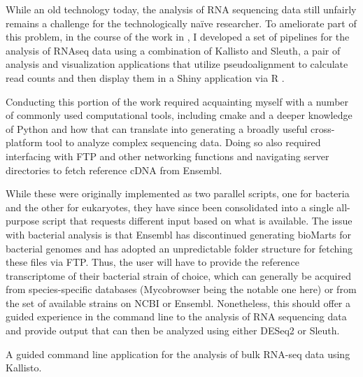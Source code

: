 While an old technology today, the analysis of RNA sequencing data still unfairly remains a challenge for the technologically na\"{i}ve researcher. To ameliorate part of this problem, in the course of the work in \citet{Saelens2022}, I developed a set of pipelines for the analysis of RNAseq data using a combination of Kallisto and Sleuth, a pair of analysis and visualization applications that utilize pseudoalignment to calculate read counts and then display them in a Shiny application via R \citep{Pimentel2017}.

Conducting this portion of the work required acquainting myself with a number of commonly used computational tools, including cmake and a deeper knowledge of Python and how that can translate into generating a broadly useful cross\hyp{}platform tool to analyze complex sequencing data. Doing so also required interfacing with FTP and other networking functions and navigating server directories to fetch reference cDNA from Ensembl.

While these were originally implemented as two parallel scripts, one for bacteria and the other for eukaryotes, they have since been consolidated into a single all\hyp{}purpose script that requests different input based on what is available. The issue with bacterial analysis is that Ensembl has discontinued generating bioMarts for bacterial genomes and has adopted an unpredictable folder structure for fetching these files via FTP. Thus, the user will have to provide the reference transcriptome of their bacterial strain of choice, which can generally be acquired from species\hyp{}specific databases (Mycobrowser being the notable one here) or from the set of available strains on NCBI or Ensembl. Nonetheless, this should offer a guided experience in the command line to the analysis of RNA sequencing data and provide output that can then be analyzed using either DESeq2 or Sleuth.

\begin{code}
\caption{A guided command line application for the analysis of bulk RNA\hyp{}seq data using Kallisto.}
\label{blinder}

\inputminted[breaklines,frame=single,fontsize=\small]{python}{source/allKallisto.py}

\end{code}

